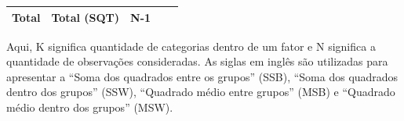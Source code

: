 \documentclass[
]{book}
\newenvironment{Shaded}{\begin{snugshade}}{\end{snugshade}}
\newcommand{\DataTypeTok}[1]{\textcolor[rgb]{0.13,0.29,0.53}{#1}}
\newcommand{\KeywordTok}[1]{\textcolor[rgb]{0.13,0.29,0.53}{\textbf{#1}}}
\newcommand{\NormalTok}[1]{#1}
\newcommand{\OperatorTok}[1]{\textcolor[rgb]{0.81,0.36,0.00}{\textbf{#1}}}
\newcommand{\OtherTok}[1]{\textcolor[rgb]{0.56,0.35,0.01}{#1}}
\newcommand{\StringTok}[1]{\textcolor[rgb]{0.31,0.60,0.02}{#1}}
\begin{document}
\begin{longtable}[]{@{}lllll@{}}
\begin{minipage}[t]{0.17\columnwidth}\raggedright
Total\strut
\end{minipage} & \begin{minipage}[t]{0.17\columnwidth}\raggedright
Total (SQT)\strut
\end{minipage} & \begin{minipage}[t]{0.17\columnwidth}\raggedright
N-1\strut
\end{minipage} & \begin{minipage}[t]{0.17\columnwidth}\raggedright
\strut
\end{minipage} & \begin{minipage}[t]{0.17\columnwidth}\raggedright
\strut
\end{minipage}\tabularnewline
\bottomrule
\end{longtable}

Aqui, K significa quantidade de categorias dentro de um fator e N
significa a quantidade de observações consideradas. As siglas em inglês
são utilizadas para apresentar a ``Soma dos quadrados entre os grupos''
(SSB), ``Soma dos quadrados dentro dos grupos'' (SSW), ``Quadrado médio
entre grupos'' (MSB) e ``Quadrado médio dentro dos grupos'' (MSW).

\begin{Shaded}
\end{Shaded}
\end{document}
